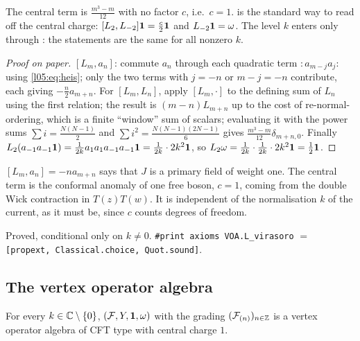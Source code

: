 \begin{dictionary}
The central term is $\frac{m^3-m}{12}$ with no factor $c$, i.e.\ $c=1$.  is the
standard way to read off the central charge: $[L_2,L_{-2}]\mathbf{1}=\frac c2\mathbf{1}$ and
$L_{-2}\mathbf{1}=\omega$. The level $k$ enters only through : the statements are the same for all
nonzero $k$.
\end{dictionary}

\begin{proof}[Proof on paper]
$[L_m,a_n]$: commute $a_n$ through each quadratic term ${:}a_{m-j}a_j{:}$ using \eqref{l05:eq:heis}; only
the two terms with $j=-n$ or $m-j=-n$ contribute, each giving $-\frac{n}{2}a_{m+n}$. For $[L_m,L_n]$, apply
$[L_m,\cdot]$ to the defining sum of $L_n$ using the first relation; the result is $(m-n)L_{m+n}$ up to the
cost of re-normal-ordering, which is a finite ``window'' sum of scalars; evaluating it with the power sums
$\sum i=\frac{N(N-1)}2$ and $\sum i^2=\frac{N(N-1)(2N-1)}6$ gives $\frac{m^3-m}{12}\delta_{m+n,0}$. Finally
$L_2(a_{-1}a_{-1}\mathbf{1})=\frac1{2k}a_1a_1a_{-1}a_{-1}\mathbf{1}=\frac1{2k}\cdot2k^2\mathbf{1}$, so
$L_2\omega=\frac1{2k}\cdot\frac1{2k}\cdot 2k^2\mathbf{1}=\frac12\mathbf{1}$.
\end{proof}

\begin{physics}
$[L_m,a_n]=-na_{m+n}$ says that $J$ is a primary field of weight one. The central term is the conformal
anomaly of one free boson, $c=1$, coming from the double Wick contraction in $T(z)T(w)$. It is independent
of the normalisation $k$ of the current, as it must be, since $c$ counts degrees of freedom.
\end{physics}

\begin{status}
Proved, conditional only on $k\neq0$. \texttt{\#print axioms VOA.L\_virasoro} $=$
\texttt{[propext, Classical.choice, Quot.sound]}.
\end{status}

\subsection{The vertex operator algebra}

\begin{theorem}\label{l05:thm:heisVOA}
For every $k\in{\mathbb{C}}\setminus\{0\}$, $(\mathcal{F},Y,\mathbf{1},\omega)$ with the grading
$(\mathcal{F}_{(n)})_{n\in{\mathbb{Z}}}$ is a vertex operator algebra of CFT type with central charge $1$.
\end{theorem}

